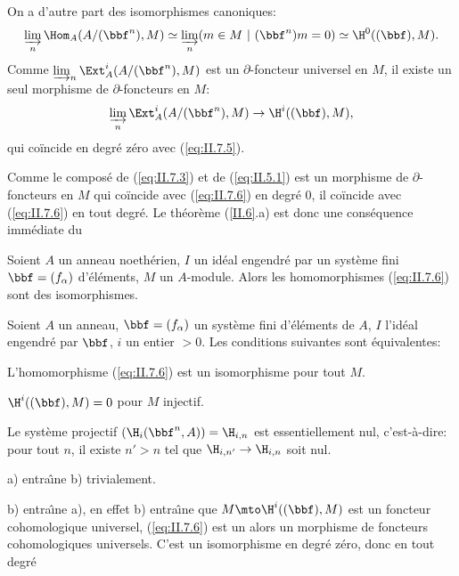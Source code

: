 On a d'autre part des isomorphismes canoniques:
\begin{equation} \label{eq:II.7.5} \varinjlim_{n} \Hom_A(A/(\bbf^n), M) \simeq \varinjlim_{n} (m\in M\ |\ (\bbf^n)m=0) \simeq \H^0((\bbf), M).
\end{equation}
Comme $\varinjlim_{n} \Ext_A^i(A/(\bbf^n), M)$ est un $\partial$-foncteur universel en $M$, il existe un seul morphisme de $\partial$-foncteurs en $M$:
\begin{equation} \label{eq:II.7.6} \varinjlim_{n} \Ext_A^i(A/(\bbf^n), M) \to \H^i((\bbf), M),
\end{equation}
qui co\"incide en degr\'e z\'ero avec (\ref{eq:II.7.5}).

Comme le compos\'e de (\ref{eq:II.7.3}) et de (\ref{eq:II.5.1}) est un morphisme de $\partial$-foncteurs en $M$ qui co\"incide avec (\ref{eq:II.7.6}) en degr\'e $0$, il co\"incide avec (\ref{eq:II.7.6}) en tout degr\'e. Le th\'eor\`eme (\ref{II.6}.a) est donc une cons\'equence imm\'ediate du

\begin{suplemme} \label{II.8}
Soient $A$ un anneau noeth\'erien, $I$ un id\'eal engendr\'e par un syst\`eme fini $\bbf=(f_{\alpha})$ d'\'el\'ements, $M$ un $A$-module. Alors les homomorphismes (\ref{eq:II.7.6}) sont des isomorphismes.
\end{suplemme}

\begin{suplemme} \label{II.9}
Soient $A$ un anneau, $\bbf=(f_{\alpha})$ un syst\`eme fini d'\'el\'ements de $A$, $I$ l'id\'eal engendr\'e par $\bbf$, $i$ un entier $>0$. Les conditions suivantes sont \'equivalentes:
\begin{enumeratea}
\item
L'homomorphisme (\ref{eq:II.7.6}) est un isomorphisme pour tout $M$.
\item
$\H^i((\bbf), M)=0$ pour $M$ injectif.
\item
Le syst\`eme projectif $(\H_i(\bbf^n, A))=\H_{i, n}$ est essentiellement nul, c'est-\`a-dire: pour tout $n$, il existe $n'>n$ tel que $\H_{i, n'}\to\H_{i, n}$ soit nul.
\end{enumeratea}
\end{suplemme}

a) entra\^\i ne b) trivialement.

b) entra\^\i ne a), en effet b) entra\^\i ne que $M\mto\H^i((\bbf), M)$ est un foncteur cohomologique universel, (\ref{eq:II.7.6}) est un alors un morphisme de foncteurs cohomologiques universels. C'est un isomorphisme en degr\'e z\'ero, donc en tout degr\'e

